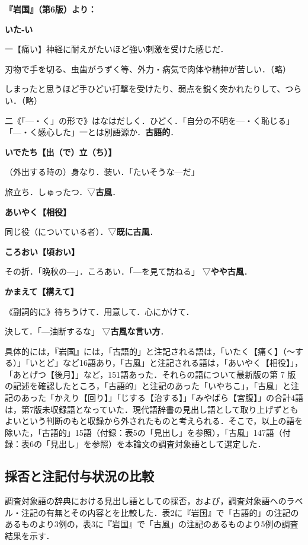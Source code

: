 \documentclass[japanese]{jnlp_1.4}
\newcommand{\MaruOne}{}
\newcommand{\MaruTwo}{}
\begin{document}
\textbf{『岩国』（第6版）より：}

{\setlength{\leftskip}{2zw}\setlength{\parindent}{0pt}
\textbf{いた‐い}

一【痛い】神経に耐えがたいほど強い刺激を受けた感じだ．

\MaruOne 刃物で手を切る、虫歯がうずく等、外力・病気で肉体や精神が苦しい．（略）

\MaruTwo しまったと思うほど手ひどい打撃を受けたり、弱点を鋭く突かれたりして、つらい．（略）

二《「—・く」の形で》はなはだしく．ひどく．「自分の不明を—・く恥じる」「—・く感心した」一とは別語源か．\textbf{古語的}．

\textbf{いでたち【出（で）立（ち）】}

\MaruOne （外出する時の）身なり．装い．「たいそうな—だ」

\MaruTwo 旅立ち．しゅったつ．▽\textbf{古風}．

\textbf{あいやく【相役】}

同じ役（についている者）．▽\textbf{既に古風}．

\textbf{ころおい【頃おい】}

その折．「晩秋の—」．ころあい．「—を見て訪ねる」 ▽\textbf{やや古風}．

\textbf{かまえて【構えて】}

《副詞的に》\MaruOne 待ちうけて．用意して．心にかけて．

\MaruTwo 決して．「—油断するな」 ▽\textbf{古風な言い方}．
\par}

具体的には，『岩国』には，「古語的」と注記される語は，「いたく【痛く】（〜する）」「いとど」など16語あり，「古風」と注記される語は，「あいやく【相役】」，「あとげつ【後月】」など，151語あった．それらの語について最新版の第 7 版の記述を確認したところ，「古語的」と注記のあった「いやちこ」，「古風」と注記のあった「かえり【回り】」「じする【治する】」「みやばら【宮腹】」の合計4語は，第7版未収録語となっていた．現代語辞書の見出し語として取り上げずともよいという判断のもと収録から外されたものと考えられる．そこで，以上の語を除いた，「古語的」15語（付録：表5の「見出し」を参照），「古風」147語（付録：表6の「見出し」を参照）を本論文の調査対象語として選定した．


\subsection{採否と注記付与状況の比較}

調査対象語の辞典における見出し語としての採否，および，調査対象語へのラベル・注記の有無とその内容とを比較した．表2に『岩国』で「古語的」の注記のあるものより3例の，表3に『岩国』で「古風」の注記のあるものより5例の調査結果を示す．
\end{document}
